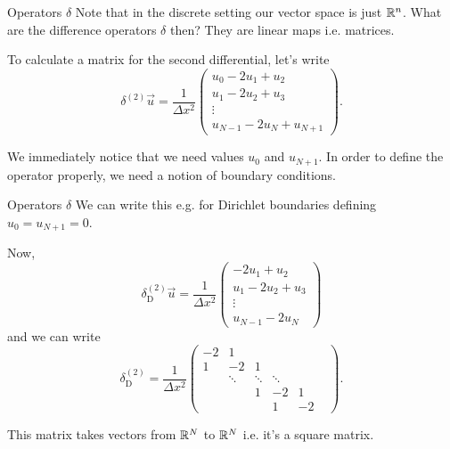 
\begin{frame}{Operators $ \delta $}
	Note that in the discrete setting our vector space is just $ \mathbb{R}^n $. What are the difference operators $ \delta $ then? %
	They are linear maps i.e. matrices. 
	
	\pause
	To calculate a matrix for the second differential, let's write
	 \[ \delta^{(2)} \vec{u} = \frac{1}{\Delta x^2}\begin{pmatrix}
		u_0 - 2 u_1 + u_2 \\ u_1 - 2 u_2 + u_3 \\  \vdots \\ u_{N-1} - 2u_{N} + u_{N+1}
	\end{pmatrix}. \] 
	
	\pause
	We immediately notice that we need values $ u_0 $ and $ u_{N+1} $. In order to define the operator properly, we need a notion of boundary conditions.

\end{frame}


\begin{frame}{Operators $ \delta $}
	We can write this e.g. for Dirichlet boundaries defining $ u_0 = u_{N+1} = 0 $. 
	
	\pause
	Now,
	\[ \delta^{(2)}_{\text{D}} \vec{u} = \frac{1}{\Delta x^2}\begin{pmatrix}
		 - 2 u_1 + u_2 \\ u_1 - 2 u_2 + u_3 \\  \vdots \\ u_{N-1} - 2u_{N}
	\end{pmatrix} \]
	and we can write
	\[ \delta^{(2)}_{\text{D}} = \frac{1}{\Delta x^2} \begin{pmatrix}
		-2 & 1  &   & &  &  \\
		1  & -2 & 1 &  &  & \\
		 & \ddots & \ddots & \ddots  & & \\
		 & & 1 & -2 & 1 & \\
		 & & & 1 & -2 &
	\end{pmatrix}. \]
	
	\pause
	This matrix takes vectors from $ \mathbb{R}^N $ to $ \mathbb{R}^N $ i.e. it's a square matrix. 
	
\end{frame}


